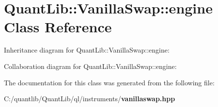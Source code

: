 \section{Quant\+Lib\+:\+:Vanilla\+Swap\+:\+:engine Class Reference}
\label{class_quant_lib_1_1_vanilla_swap_1_1engine}


Inheritance diagram for Quant\+Lib\+:\+:Vanilla\+Swap\+:\+:engine\+:


Collaboration diagram for Quant\+Lib\+:\+:Vanilla\+Swap\+:\+:engine\+:


The documentation for this class was generated from the following file\+:\begin{DoxyCompactItemize}
\item 
C\+:/quantlib/\+Quant\+Lib/ql/instruments/{\bf vanillaswap.\+hpp}\end{DoxyCompactItemize}
